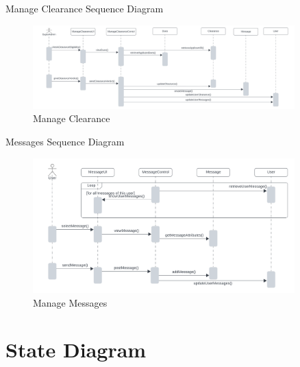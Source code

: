 \documentclass[20pt]{beamer}
\numberwithin{figure}{section}
\begin{document}
\begin{frame}{Manage Clearance Sequence Diagram}

     \begin{figure}
        \centering
        \includegraphics[width= 0.9\textwidth , height= 0.3\paperheight]{ManageClearanceSeq.png}
        \caption{Manage Clearance}
        \label{fig:37}
    \end{figure}

\end{frame}

\begin{frame}{Messages Sequence Diagram}

     \begin{figure}
        \centering
        \includegraphics[width= 0.9\textwidth , height= 0.3\paperheight]{MessagesSeq.png}
        \caption{Manage Messages}
        \label{fig:37}
    \end{figure}

\end{frame}

\section {State Diagram}
\end{document}
